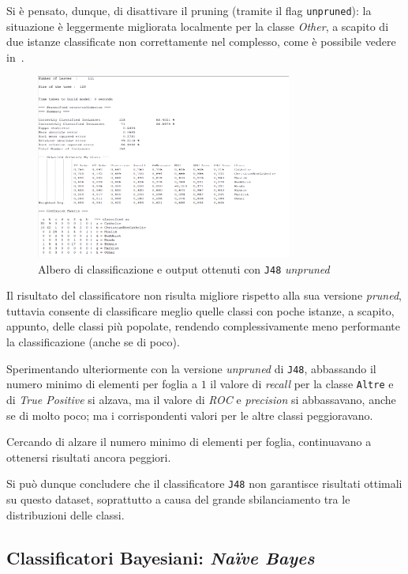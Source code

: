 \documentclass[a4paper,11pt,twoside,notitlepage,final]{scrartcl}
\begin{document}
Si è pensato, dunque, di disattivare il pruning (tramite il flag \texttt{unpruned}): la situazione è leggermente migliorata localmente per la classe \emph{Other},
a scapito di due istanze classificate non correttamente nel complesso, come è possibile vedere in~.


\begin{figure}[H]
  \centering
  \includegraphics[width=0.75\textwidth]{fig/DecisionTree2.PNG}%
  \caption{Albero di classificazione e output ottenuti con \texttt{J48} \emph{unpruned}}%
  \label{fig:j48}
\end{figure}

Il risultato del classificatore non risulta migliore rispetto alla sua versione \emph{pruned}, tuttavia consente di classificare meglio quelle classi con poche istanze,
a scapito, appunto, delle classi più popolate, rendendo complessivamente meno performante la classificazione (anche se di poco).

Sperimentando ulteriormente con la versione \emph{unpruned} di \texttt{J48},
abbassando il numero minimo di elementi per foglia a \(1\) il valore di \emph{recall} per la classe \texttt{Altre} e di \emph{True Positive} si alzava,
ma il valore di \emph{ROC} e \emph{precision} si abbassavano, anche se di molto poco; ma i corrispondenti valori per le altre classi peggioravano.

Cercando di alzare il numero minimo di elementi per foglia, continuavano a ottenersi risultati ancora peggiori.

Si può dunque concludere che il classificatore \texttt{J48} non garantisce risultati ottimali su questo dataset, soprattutto a causa del grande sbilanciamento tra le distribuzioni delle classi.

\subsection{Classificatori Bayesiani: \emph{Naïve Bayes}}\label{subsec:bayes}
\end{document}
